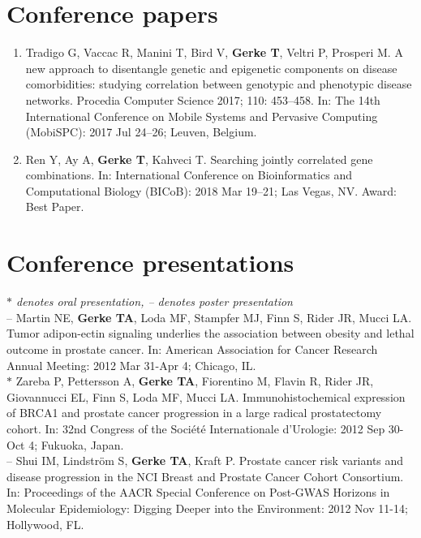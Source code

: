 \documentclass[11pt, a4paper]{article} %
\begin{document}
\section*{Conference papers}
\begin{enumerate}[leftmargin=*]
\item{} Tradigo G, Vaccac R, Manini T, Bird V, {\bf Gerke T}, Veltri P, Prosperi M. A new approach to disentangle genetic and epigenetic components on disease comorbidities: studying correlation between genotypic and phenotypic disease networks. Procedia Computer Science 2017; 110: 453--458. In: The 14th International Conference on Mobile Systems and Pervasive Computing (MobiSPC): 2017 Jul 24--26; Leuven, Belgium.

\item{} Ren Y, Ay A, {\bf Gerke T}, Kahveci T. Searching jointly correlated gene combinations. In: International Conference on Bioinformatics and Computational Biology (BICoB): 2018 Mar 19--21; Las Vegas, NV. Award: Best Paper. 
\end{enumerate}

\section*{Conference presentations}
\vspace{-.3cm}
{\footnotesize\emph{$*$ denotes oral presentation, -- denotes poster presentation}}\\

-- Martin NE, {\bf Gerke TA}, Loda MF, Stampfer MJ, Finn S, Rider JR, Mucci LA. Tumor adipon-ectin signaling underlies the association between obesity and lethal outcome in prostate cancer. In: American Association for Cancer Research Annual Meeting: 2012 Mar 31-Apr 4; Chicago, IL.\\

$*$ Zareba P, Pettersson A, {\bf Gerke TA}, Fiorentino M, Flavin R, Rider JR, Giovannucci EL, Finn S, Loda MF, Mucci LA. Immunohistochemical expression of BRCA1 and prostate cancer progression in  a large radical prostatectomy cohort. In: 32nd Congress of the Soci\'{e}t\'{e} Internationale d'Urologie: 2012 Sep 30-Oct 4; Fukuoka, Japan.\\

-- Shui IM, Lindstr\"{o}m S, {\bf Gerke TA}, Kraft P. Prostate cancer risk variants and disease progression in the NCI Breast and Prostate Cancer Cohort Consortium. In: Proceedings of the AACR Special Conference on Post-GWAS Horizons in Molecular Epidemiology: Digging Deeper into the Environment: 2012 Nov 11-14; Hollywood, FL.\\
\end{document}
